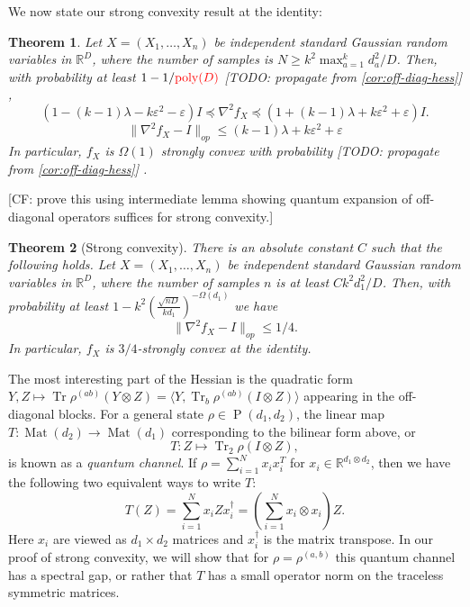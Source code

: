 \documentclass{article}
\newtheorem{theorem}{Theorem}
\DeclareMathOperator{\poly}{poly}
\DeclarePairedDelimiter{\norm}{\lVert}{\rVert}
\newcommand{\R}{{\mathbb{R}}}
\newcommand{\ot}{\otimes}
\newcommand{\mat}{\operatorname{Mat}}
\newcommand\eps{\varepsilon}
\newcommand\PD{\operatorname{P}}
\newcommand\samp{x}
\newcommand\rv{X}
\newcommand\tr{\operatorname{Tr}}
\newcommand{\CF}[1]{{\color{purple}[CF: #1]}}
\newcommand{\MW}[1]{{\color{red}[MW: #1]}}
\newcommand{\TODO}[1]{{\color{blue}[TODO: #1]}}
\begin{document}







We now state our strong convexity result at the identity:

\begin{theorem}\label{thm:tensor-convexity-old}
Let $\rv = (\rv_1,\dots,\rv_n)$ be independent standard Gaussian random variables in $\R^D$, where the number of samples is $N \geq k^2 \max_{a=1}^k d_a^2 / D$. Then, with probability at least $1 - 1/{\color{red}\poly(D)}$ \TODO{propagate from \cref{cor:off-diag-hess}} , 
$$ (1 - (k - 1) \lambda - k \eps^2 - \eps) I \preceq 
 \nabla^2 f_{\rv} \preceq (1 + (k - 1) \lambda + k \eps^2 + \eps) I.$$
$$ \|\nabla^{2} f_{\rv} - I\|_{op} \leq (k - 1) \lambda + k \eps^2 + \eps $$
 In particular, $f_{\rv}$ is $\Omega(1)$ strongly convex with probability \TODO{propagate from \cref{cor:off-diag-hess}} . 
\end{theorem}

\CF{prove this using intermediate lemma showing quantum expansion of off-diagonal operators suffices for strong convexity.}

\begin{theorem}[Strong convexity]\label{thm:tensor-convexity} There is an absolute constant $C$ such that the following holds. Let $\rv = (\rv_1,\dots,\rv_n)$ be independent standard Gaussian random variables in $\R^D$, where the number of samples $n$ is at least $C k^2 d_1^2/D$. Then, with probability at least $1 - k^2 \left(\frac {\sqrt{nD}}{kd_1}\right)^{ - \Omega(d_1)}$ we have
$$ \|\nabla^{2} f_{\rv} - I\|_{op} \leq 1/4.$$
In particular, $f_{\rv}$ is $3/4$-strongly convex at the identity.
\end{theorem}



The most interesting part of the Hessian is the quadratic form $Y,Z \mapsto \tr \rho^{(ab)} \left( Y \ot Z \right) = \langle Y, \tr_b \rho^{(ab)} \left(I \ot Z\right) \rangle$ appearing in the off-diagonal blocks. For a general state $\rho \in \PD(d_1, d_2)$, the linear map $T:\mat(d_2) \to \mat(d_1)$ corresponding to the bilinear form above, or
$$T: Z \mapsto \tr_2 \rho \left(I \ot Z\right),$$
 is known as a \emph{quantum channel}. If $\rho = \sum_{i = 1}^N x_i x_i^T$ for $x_i \in \R^{d_1 \ot d_2}$, then we have the following two equivalent ways to write $T$:
$$ T(Z) = \sum_{i = 1}^N x_i Z x_i^\dagger = \left(\sum_{i = 1}^N x_i \ot x_i\right) Z.$$ 
Here $x_i$ are viewed as $d_1 \times d_2$ matrices and $x_i^\dagger$ is the matrix transpose. In our proof of strong convexity, we will show that for $\rho = \rho^{(a,b)}$ this quantum channel has a spectral gap, or rather that $T$ has a small operator norm on the traceless symmetric matrices. 
\end{document}
